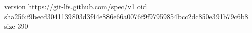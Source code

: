 version https://git-lfs.github.com/spec/v1
oid sha256:f9becd3041139803d3f44e886e66a0076f9f97959854bcc2dc850e391b79c6b8
size 390
